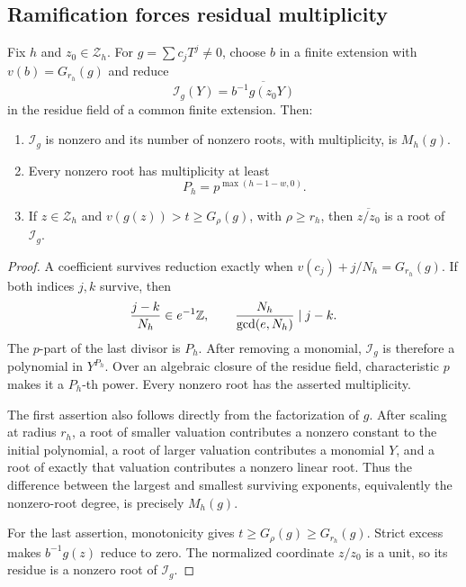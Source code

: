 \subsection{Ramification forces residual multiplicity}
\begin{lemma}
\label{lem:initial}
Fix $h$ and $z_0\in\mathcal Z_h$. For $g=\sum c_jT^j\ne0$, choose $b$ in a finite extension with $v(b)=G_{r_h}(g)$ and reduce
\[
\mathcal I_g(Y)=\overline{b^{-1}g(z_0Y)}
\]
in the residue field of a common finite extension. Then:
\begin{enumerate}
\item $\mathcal I_g$ is nonzero and its number of nonzero roots, with multiplicity, is $M_h(g)$.
\item Every nonzero root has multiplicity at least
\[
 P_h=p^{\max(h-1-w,0)}.
\]
\item If $z\in\mathcal Z_h$ and $v(g(z))>t\ge G_\rho(g)$, with $\rho\ge r_h$, then $\overline{z/z_0}$ is a root of $\mathcal I_g$.
\end{enumerate}
\end{lemma}
\begin{proof}
A coefficient survives reduction exactly when
$v(c_j)+j/N_h=G_{r_h}(g)$. If both indices $j,k$ survive, then
\[
 \frac{j-k}{N_h}\in e^{-1}\mathbb Z,
 \qquad \frac{N_h}{\gcd(e,N_h)}\mid j-k.
\]
The $p$-part of the last divisor is $P_h$. After removing a monomial, $\mathcal I_g$ is therefore a polynomial in $Y^{P_h}$. Over an algebraic closure of the residue field, characteristic $p$ makes it a $P_h$-th power. Every nonzero root has the asserted multiplicity.

The first assertion also follows directly from the factorization of $g$. After scaling at radius $r_h$, a root of smaller valuation contributes a nonzero constant to the initial polynomial, a root of larger valuation contributes a monomial $Y$, and a root of exactly that valuation contributes a nonzero linear root. Thus the difference between the largest and smallest surviving exponents, equivalently the nonzero-root degree, is precisely $M_h(g)$.

For the last assertion, monotonicity gives $t\ge G_\rho(g)\ge G_{r_h}(g)$. Strict excess makes $b^{-1}g(z)$ reduce to zero. The normalized coordinate $z/z_0$ is a unit, so its residue is a nonzero root of $\mathcal I_g$.
\end{proof}

